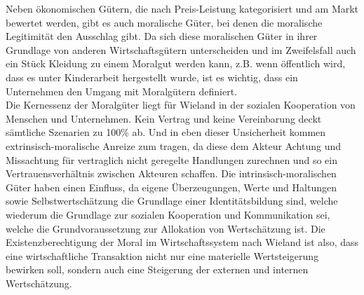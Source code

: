 \documentclass[12pt]{article}
\begin{document}
Neben ökonomischen Gütern, die nach Preis-Leistung kategorisiert und am Markt bewertet werden, gibt es auch moralische Güter, bei denen die moralische Legitimität den Ausschlag gibt. Da sich diese moralischen Güter in ihrer Grundlage von anderen Wirtschaftsgütern unterscheiden und im Zweifelsfall auch ein Stück Kleidung zu einem Moralgut werden kann, z.B. wenn öffentlich wird, dass es unter Kinderarbeit hergestellt wurde, ist es wichtig, dass ein Unternehmen den Umgang mit Moralgütern definiert.\\
Die Kernessenz der Moralgüter liegt für Wieland in der sozialen Kooperation von Menschen und Unternehmen. Kein Vertrag und keine Vereinbarung deckt sämtliche Szenarien zu 100\% ab. Und in eben dieser Unsicherheit kommen extrinsisch-moralische Anreize zum tragen, da diese dem Akteur Achtung und Missachtung für vertraglich nicht geregelte Handlungen zurechnen und so ein Vertrauensverhältnis zwischen Akteuren schaffen. Die intrinsisch-moralischen Güter haben einen Einfluss, da eigene Überzeugungen, Werte und Haltungen sowie Selbstwertschätzung die Grundlage einer Identitätsbildung sind, welche wiederum die Grundlage zur sozialen Kooperation und Kommunikation sei, welche die Grundvoraussetzung zur Allokation von Wertschätzung ist. Die Existenzberechtigung der Moral im Wirtschaftssystem nach Wieland ist also, dass eine wirtschaftliche Transaktion nicht nur eine materielle Wertsteigerung bewirken soll, sondern auch eine Steigerung der externen und internen Wertschätzung.
\end{document}
